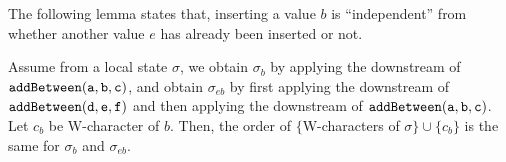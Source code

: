The following lemma states that, inserting a value $b$ is ``independent'' from whether another value $e$ has already been inserted or not.

\begin{lemma}
\label{lemma:in Wooki algorithm,the order of sigma and b is the same, between insert b and first insert e and then insert b}
Assume from a local state $\sigma$, we obtain $\sigma_b$ by applying the downstream of $\alabelshort[{\tt addBetween}]{a,b,c}$, and obtain $\sigma_{eb}$ by first applying the downstream of $\alabelshort[{\tt addBetween}]{d,e,f}$ and then applying the downstream of $\alabelshort[{\tt addBetween}]{a,b,c}$. Let $c_b$ be W-character of $b$. Then, the order of $\{$W-characters of $\sigma \} \cup \{ c_b \}$ is the same for $\sigma_b$ and $\sigma_{eb}$.
\end{lemma}


